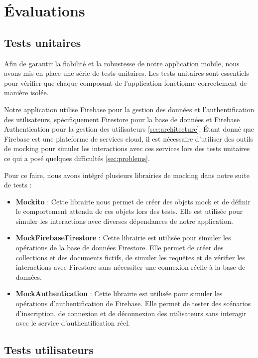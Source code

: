 \section{Évaluations}

\subsection{Tests unitaires}

Afin de garantir la fiabilité et la robustesse de notre application mobile, nous avons mis en place une série de tests unitaires. Les tests unitaires sont essentiels pour vérifier que chaque composant de l'application fonctionne correctement de manière isolée.

Notre application utilise Firebase pour la gestion des données et l'authentification des utilisateurs, spécifiquement Firestore pour la base de données et Firebase Authentication pour la gestion des utilisateurs \ref{sec:architecture}. Étant donné que Firebase est une plateforme de services cloud, il est nécessaire d'utiliser des outils de mocking pour simuler les interactions avec ces services lors des tests unitaires ce qui a posé quelques difficultés \ref{sec:problems}.

Pour ce faire, nous avons intégré plusieurs librairies de mocking dans notre suite de tests :

\begin{itemize}[noitemsep]
    \item \textbf{Mockito} : Cette librairie nous permet de créer des objets mock et de définir le comportement attendu de ces objets lors des tests. Elle est utilisée pour simuler les interactions avec diverses dépendances de notre application.
    \item \textbf{MockFirebaseFirestore} : Cette librairie est utilisée pour simuler les opérations de la base de données Firestore. Elle permet de créer des collections et des documents fictifs, de simuler les requêtes et de vérifier les interactions avec Firestore sans nécessiter une connexion réelle à la base de données.
    \item \textbf{MockAuthentication} : Cette librairie est utilisée pour simuler les opérations d'authentification de Firebase. Elle permet de tester des scénarios d'inscription, de connexion et de déconnexion des utilisateurs sans interagir avec le service d'authentification réel.
\end{itemize}

\subsection{Tests utilisateurs}

